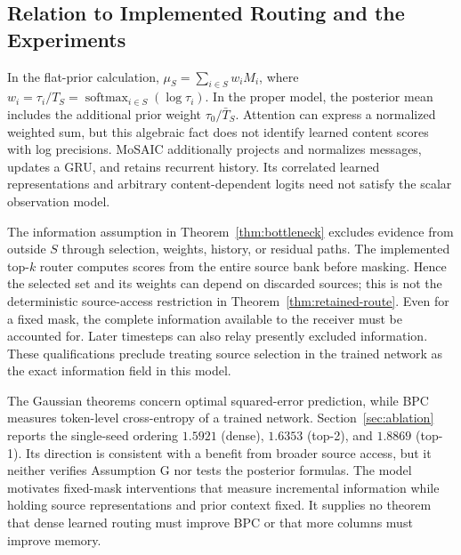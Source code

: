 \subsection{Relation to Implemented Routing and the Experiments}

In the flat-prior calculation, $\mu_S=\sum_{i\in S}w_i M_i$, where $w_i=\tau_i/T_S=\operatorname{softmax}_{i\in S}(\log\tau_i)$. In the proper model, the posterior mean includes the additional prior weight $\tau_0/\bar T_S$. Attention can express a normalized weighted sum, but this algebraic fact does not identify learned content scores with log precisions. MoSAIC additionally projects and normalizes messages, updates a GRU, and retains recurrent history. Its correlated learned representations and arbitrary content-dependent logits need not satisfy the scalar observation model.

The information assumption in Theorem~\ref{thm:bottleneck} excludes evidence from outside $S$ through selection, weights, history, or residual paths. The implemented top-$k$ router computes scores from the entire source bank before masking. Hence the selected set and its weights can depend on discarded sources; this is not the deterministic source-access restriction in Theorem~\ref{thm:retained-route}. Even for a fixed mask, the complete information available to the receiver must be accounted for. Later timesteps can also relay presently excluded information. These qualifications preclude treating source selection in the trained network as the exact information field in this model.

The Gaussian theorems concern optimal squared-error prediction, while BPC measures token-level cross-entropy of a trained network. Section~\ref{sec:ablation} reports the single-seed ordering $1.5921$ (dense), $1.6353$ (top-2), and $1.8869$ (top-1). Its direction is consistent with a benefit from broader source access, but it neither verifies Assumption G nor tests the posterior formulas. The model motivates fixed-mask interventions that measure incremental information while holding source representations and prior context fixed. It supplies no theorem that dense learned routing must improve BPC or that more columns must improve memory.
